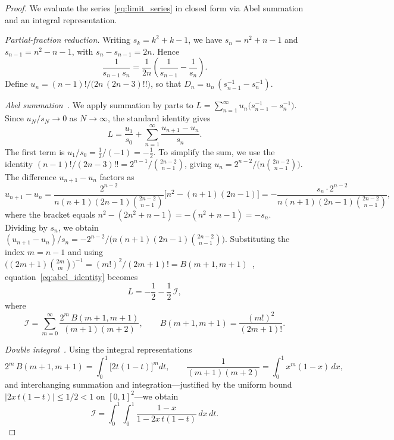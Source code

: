\documentclass[11pt,reqno]{amsart}
\theoremstyle{definition}
\begin{document}
\begin{proof}
We evaluate the series~\eqref{eq:limit_series} in closed form via Abel summation and an integral representation.

\emph{Partial-fraction reduction.}
Writing $s_k=k^2+k-1$, we have $s_n = n^2+n-1$ and $s_{n-1}=n^2-n-1$, with $s_n - s_{n-1}=2n$. Hence
\begin{equation}\label{eq:pf_sn}
  \frac{1}{s_{n-1}\,s_n}=\frac{1}{2n}\!\left(\frac{1}{s_{n-1}}-\frac{1}{s_n}\right).
\end{equation}
Define $u_n=(n-1)!\bigl/\bigl(2n\,(2n-3)!!\bigr)$, so that $D_n = u_n\,(s_{n-1}^{-1}-s_n^{-1})$.

\emph{Abel summation~\cite[Thm.\,12.4]{Apostol1974}.}
We apply summation by parts to $L=\sum_{n=1}^{\infty}u_n\bigl(s_{n-1}^{-1}-s_n^{-1}\bigr)$.  Since $u_N/s_N\to 0$ as $N\to\infty$, the standard identity gives
\begin{equation}\label{eq:abel_identity}
  L = \frac{u_1}{s_0}+\sum_{n=1}^{\infty}\frac{u_{n+1}-u_n}{s_n}.
\end{equation}
The first term is $u_1/s_0 = \tfrac12/(-1) = -\tfrac12$.  To simplify the sum, we use the identity $(n-1)!/(2n-3)!!=2^{n-1}/\binom{2n-2}{n-1}$, giving $u_n = 2^{n-2}\bigl/\bigl(n\binom{2n-2}{n-1}\bigr)$.  The difference $u_{n+1}-u_n$ factors as
\begin{equation}\label{eq:un_diff}
  u_{n+1}-u_n = \frac{2^{n-2}}{n(n+1)(2n-1)\binom{2n-2}{n-1}}\bigl[n^2-(n+1)(2n-1)\bigr] = -\frac{s_n\cdot 2^{n-2}}{n(n+1)(2n-1)\binom{2n-2}{n-1}},
\end{equation}
where the bracket equals $n^2-(2n^2+n-1)=-(n^2+n-1)=-s_n$.  Dividing by $s_n$, we obtain $(u_{n+1}-u_n)/s_n=-2^{n-2}\bigl/\bigl(n(n+1)(2n-1)\binom{2n-2}{n-1}\bigr)$.  Substituting the index $m=n-1$ and using $\bigl((2m+1)\binom{2m}{m}\bigr)^{-1}=(m!)^2/(2m+1)!=B(m{+}1,m{+}1)$~\cite[\S\,5.12]{DLMF}, equation~\eqref{eq:abel_identity} becomes
\begin{equation}\label{eq:L_abel}
  L = -\frac{1}{2}-\frac{1}{2}\,\mathcal{I},
\end{equation}
where
\begin{equation}\label{eq:I_def}
  \mathcal{I}=\sum_{m=0}^{\infty}\frac{2^{m}\,B(m{+}1,m{+}1)}{(m+1)(m+2)},
  \qquad B(m{+}1,m{+}1)=\frac{(m!)^2}{(2m+1)!}.
\end{equation}

\emph{Double integral~\cite[\S\,5.12]{DLMF}.}
Using the integral representations
\begin{equation}\label{eq:int_reps}
  2^m\,B(m{+}1,m{+}1)=\int_0^1\!\bigl[2t(1{-}t)\bigr]^m dt, \qquad
  \frac{1}{(m{+}1)(m{+}2)}=\int_0^1 x^m(1{-}x)\,dx,
\end{equation}
and interchanging summation and integration---justified by the uniform bound $|2x\,t(1{-}t)|\le 1/2<1$ on $[0,1]^2$---we obtain
\begin{equation}\label{eq:I_double}
  \mathcal{I}=\int_0^1\!\int_0^1 \frac{1-x}{1-2x\,t(1-t)}\,dx\,dt.
\end{equation}


\end{proof}
\end{document}

